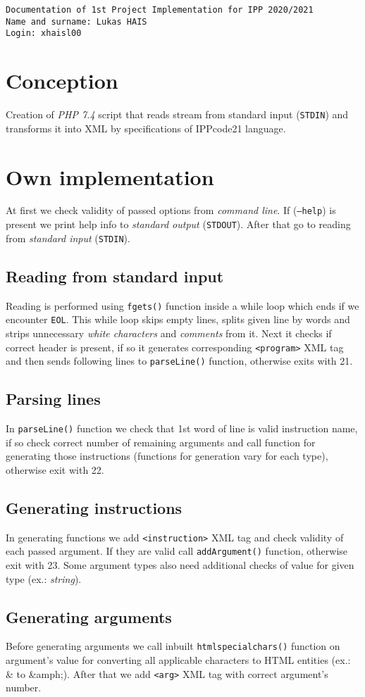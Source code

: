 \documentclass[12pt]{article}
\begin{document}
\begin{center}
	\texttt{Documentation of 1st Project Implementation for IPP 2020/2021}\\
	\texttt{Name and surname: Lukas HAIS}\\
	\texttt{Login: xhaisl00}\\
\end{center}

\section{Conception}
Creation of \emph{PHP 7.4} script that reads stream from standard input (\texttt{STDIN}) and transforms it into XML by specifications of IPPcode21 language.
\section{Own implementation}
At first we check validity of passed options from \emph{command line}. If (\texttt{--help}) is present we print help info to \emph{standard output} (\texttt{STDOUT}). After that go to reading from \emph{standard input} (\texttt{STDIN}).
\subsection{Reading from standard input}
Reading is performed using \texttt{fgets()} function inside a while loop which ends if we encounter \texttt{EOL}. This while loop skips empty lines, splits given line by words and strips unnecessary \emph{white characters} and \emph{comments} from it. Next it checks if correct header is present, if so it generates corresponding \texttt{<program>} XML tag and then sends following lines to \texttt{parseLine()} function, otherwise exits with 21.
\subsection{Parsing lines}
In \texttt{parseLine()} function we check that 1st word of line is valid instruction name, if so check correct number of remaining arguments and call function for generating those instructions (functions for generation vary for each type), otherwise exit with 22.
\subsection{Generating instructions}
In generating functions we add \texttt{<instruction>} XML tag and check validity of each passed argument. If they are valid call \texttt{addArgument()} function, otherwise exit with 23. Some argument types also need additional checks of value for given type (ex.: \emph{string}).
\subsection{Generating arguments}
Before generating arguments we call inbuilt \texttt{htmlspecialchars()} function on argument's value for converting all applicable characters to HTML entities (ex.: \& to \&amph;). After that we add \texttt{<arg>} XML tag with correct argument's number.
\end{document}
